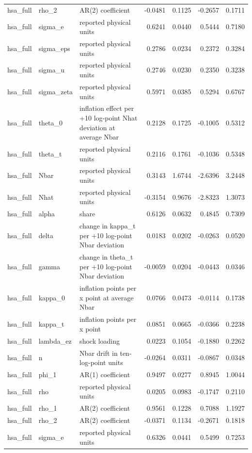 \begin{tabular}{lllrrrr}
hsa\_full & rho\_2 & AR(2) coefficient & -0.0481 & 0.1125 & -0.2657 & 0.1711 \\
hsa\_full & sigma\_e & reported physical units & 0.6241 & 0.0440 & 0.5444 & 0.7180 \\
hsa\_full & sigma\_eps & reported physical units & 0.2786 & 0.0234 & 0.2372 & 0.3284 \\
hsa\_full & sigma\_u & reported physical units & 0.2746 & 0.0230 & 0.2350 & 0.3238 \\
hsa\_full & sigma\_zeta & reported physical units & 0.5971 & 0.0385 & 0.5294 & 0.6767 \\
hsa\_full & theta\_0 & inflation effect per +10 log-point Nhat deviation at average Nbar & 0.2128 & 0.1725 & -0.1005 & 0.5312 \\
hsa\_full & theta\_t & reported physical units & 0.2116 & 0.1761 & -0.1036 & 0.5348 \\
hsa\_full & Nbar & reported physical units & 0.3143 & 1.6744 & -2.6396 & 3.2448 \\
hsa\_full & Nhat & reported physical units & -0.3154 & 0.9676 & -2.8323 & 1.3073 \\
hsa\_full & alpha & share & 0.6126 & 0.0632 & 0.4845 & 0.7309 \\
hsa\_full & delta & change in kappa\_t per +10 log-point Nbar deviation & 0.0183 & 0.0202 & -0.0263 & 0.0520 \\
hsa\_full & gamma & change in theta\_t per +10 log-point Nbar deviation & -0.0059 & 0.0204 & -0.0443 & 0.0346 \\
hsa\_full & kappa\_0 & inflation points per x point at average Nbar & 0.0766 & 0.0473 & -0.0114 & 0.1738 \\
hsa\_full & kappa\_t & inflation points per x point & 0.0851 & 0.0665 & -0.0366 & 0.2238 \\
hsa\_full & lambda\_ez & shock loading & 0.0223 & 0.1054 & -0.1880 & 0.2262 \\
hsa\_full & n & Nbar drift in ten-log-point units & -0.0264 & 0.0311 & -0.0867 & 0.0348 \\
hsa\_full & phi\_1 & AR(1) coefficient & 0.9497 & 0.0277 & 0.8945 & 1.0044 \\
hsa\_full & rho & reported physical units & 0.0205 & 0.0983 & -0.1747 & 0.2110 \\
hsa\_full & rho\_1 & AR(2) coefficient & 0.9561 & 0.1228 & 0.7088 & 1.1927 \\
hsa\_full & rho\_2 & AR(2) coefficient & -0.0371 & 0.1134 & -0.2671 & 0.1818 \\
hsa\_full & sigma\_e & reported physical units & 0.6326 & 0.0441 & 0.5499 & 0.7253 \\

\end{tabular}
